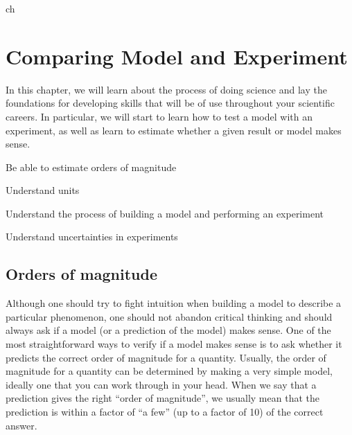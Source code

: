 ch%
%
\chapter{Comparing Model and Experiment}
\label{chap:2_ModelAndExperiment}
In this chapter, we will learn about the process of doing science and lay the foundations for developing skills that will be of use throughout your scientific careers. In particular, we will start to learn how to test a model with an experiment, as well as learn to estimate whether a given result or model makes sense.
\vspace{1cm}
\begin{learningObjectives}

{
\item Be able to estimate orders of magnitude
\item Understand units
\item Understand the process of building a model and performing an experiment
\item Understand uncertainties in experiments
}
\end{learningObjectives}

\section{Orders of magnitude}
Although one should try to fight intuition when building a model to describe a particular phenomenon, one should not abandon critical thinking and should always ask if a model (or a prediction of the model) makes sense. One of the most straightforward ways to verify if a model makes sense is to ask whether it predicts the correct order of magnitude for a quantity. Usually, the order of magnitude for a quantity can be determined by making a very simple model, ideally one that you can work through in your head. When we say that a prediction gives the right ``order of magnitude'', we usually mean that the prediction is within a factor of ``a few'' (up to a factor of 10) of the correct answer.

